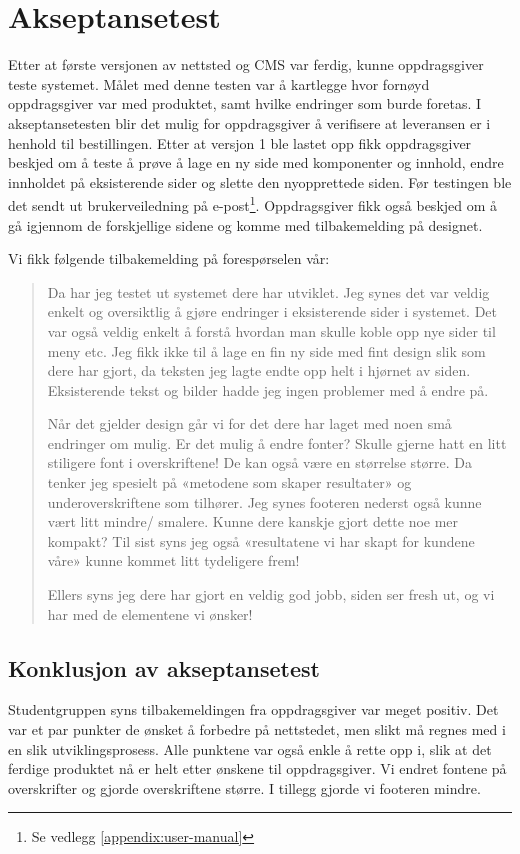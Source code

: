 \section{Akseptansetest}
Etter at første versjonen av nettsted og CMS var ferdig, kunne oppdragsgiver teste systemet. Målet med denne testen var å kartlegge hvor fornøyd oppdragsgiver var med produktet, samt hvilke endringer som burde foretas. I akseptansetesten blir det mulig for oppdragsgiver å verifisere at leveransen er i henhold til bestillingen. 
Etter at versjon 1 ble lastet opp fikk oppdragsgiver beskjed om å teste å prøve å lage en ny side med komponenter og innhold, endre innholdet på eksisterende sider og slette den nyopprettede siden. Før testingen ble det sendt ut brukerveiledning på e-post\footnote{Se vedlegg \ref{appendix:user-manual}}. Oppdragsgiver fikk også beskjed om å gå igjennom de forskjellige sidene og komme med tilbakemelding på designet. 

Vi fikk følgende tilbakemelding på forespørselen vår: 

\begin{quote}
Da har jeg testet ut systemet dere har utviklet. Jeg synes det var veldig enkelt og oversiktlig å gjøre endringer i eksisterende sider i systemet. Det var også veldig enkelt å forstå hvordan man skulle koble opp nye sider til meny etc. Jeg fikk ikke til å lage en fin ny side med fint design slik som dere har gjort, da teksten jeg lagte endte opp helt i hjørnet av siden. Eksisterende tekst og bilder hadde jeg ingen problemer med å endre på.

Når det gjelder design går vi for det dere har laget med noen små endringer om mulig. Er det mulig å endre fonter? Skulle gjerne hatt en litt stiligere font i overskriftene! De kan også være en størrelse større. Da tenker jeg spesielt på «metodene som skaper resultater» og underoverskriftene som tilhører. Jeg synes footeren nederst også kunne vært litt mindre/ smalere. Kunne dere kanskje gjort dette noe mer kompakt? Til sist syns jeg også «resultatene vi har skapt for kundene våre» kunne kommet litt tydeligere frem!

Ellers syns jeg dere har gjort en veldig god jobb, siden ser fresh ut, og vi har med de elementene vi ønsker!
\end{quote}

\subsection{Konklusjon av akseptansetest}
Studentgruppen syns tilbakemeldingen fra oppdragsgiver var meget positiv. Det var et par punkter de ønsket å forbedre på nettstedet, men slikt må regnes med i en slik utviklingsprosess. Alle punktene var også enkle å rette opp i, slik at det ferdige produktet nå er helt etter ønskene til oppdragsgiver. Vi endret fontene på overskrifter og gjorde overskriftene større. I tillegg gjorde vi footeren mindre.

